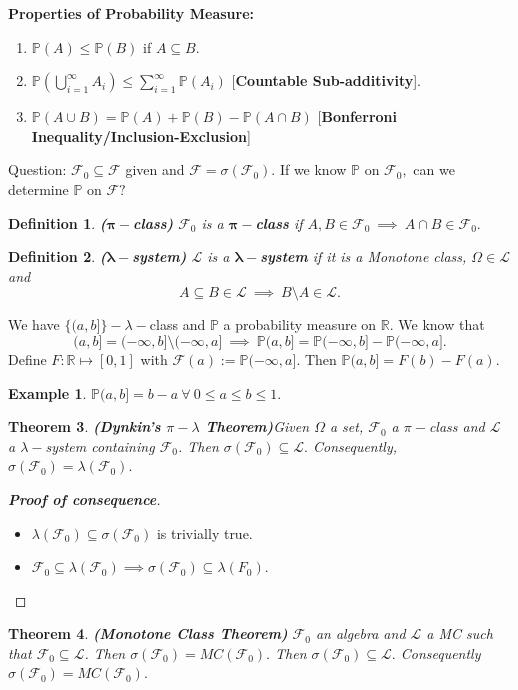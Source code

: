 \documentclass{article}
\newcommand{\1}{\mathds{1}}
\newcommand{\R}{\mathbb{R}}
\newcommand{\F}{\mathcal{F}}
\newcommand{\LL}{\mathcal{L}}
\newcommand{\PB}{\mathbb{P}}
\newcommand{\lf}{\left}
\newcommand{\rg}{\right}
\newcommand{\sm}{\setminus}
\newtheorem{theorem}{Theorem}[section]
\newtheorem{definition}[theorem]{Definition}
\newtheorem{example}{Example}
\begin{document}
\textbf{Properties of Probability Measure:}
\begin{enumerate}
    \item $\PB(A)\leq \PB(B)$ if $A\subseteq B.$
    \item $\PB\lf(\bigcup_{i=1}^\infty A_i\rg)\leq \sum_{i=1}^\infty\PB(A_i)$ [\textbf{Countable Sub-additivity}].
    \item $\PB(A\cup B)=\PB(A)+\PB(B)-\PB(A\cap B)$ [\textbf{Bonferroni Inequality/Inclusion-Exclusion}]
\end{enumerate}
Question: $\F_0\subseteq \F$ given and $\F=\sigma(\F_0)$. If we know $\PB$ on $\F_0,$ can we determine $\PB$ on $\F?$

\begin{definition}\textbf{($\mathbf{\pi-}$class)}
    $\F_0$ is a $\mathbf{\pi-}$\textbf{class} if $A,B\in\F_0\ \implies\ A\cap B\in\F_0.$
\end{definition}
\begin{definition}\textbf{($\mathbf{\lambda-}$system)}
    $\LL$ is a $\mathbf{\lambda-}$\textbf{system} if it is a Monotone class, $\Omega\in\LL$ and $$A\subseteq  B\in\LL\ \implies\ B\sm A\in\LL.$$ 
\end{definition}
\noindent We have $\{(a,b]\}-\lambda-$class and $\PB$ a probability measure on $\R.$ We know that $$(a,b]=(-\infty,b]\sm (-\infty,a]\ \implies\ \PB(a,b]=\PB(-\infty,b]- \PB(-\infty,a].$$ Define $F:\R\mapsto [0,1]$ with $\F(a):=\PB(-\infty,a].$ Then $\PB(a,b]=F(b)-F(a).$
\begin{example}
    $\PB(a,b]=b-a\ \forall\ 0\leq a\leq b\leq 1.$
\end{example}
\begin{theorem}\textbf{(Dynkin's $\pi-\lambda$ Theorem)}\label{th:dynkin}
    Given $\Omega$ a set, $\F_0$ a $\pi-$class and $\LL$ a $\lambda-$system containing $\F_0$. Then $\sigma(\F_0)\subseteq\LL.$ Consequently, $\sigma(\F_0)=\lambda(\F_0).$
\end{theorem}
\begin{proof}[\textbf{Proof of consequence}]
    \begin{itemize}
        \item $\lambda(\F_0)\subseteq \sigma(\F_0)$ is trivially true.
        \item $\F_0\subseteq \lambda(\F_0)\implies \sigma(\F_0)\subseteq \lambda(F_0).$
    \end{itemize}
\end{proof}
\begin{theorem}\textbf{(Monotone Class Theorem)}
    $\F_0$ an algebra and $\LL$ a MC such that $\F_0\subseteq\LL$. Then $\sigma(\F_0)=MC(\F_0).$ Then $\sigma(\F_0)\subseteq \LL.$ Consequently $\sigma(\F_0)=MC(\F_0).$ 
\end{theorem}
\end{document}
